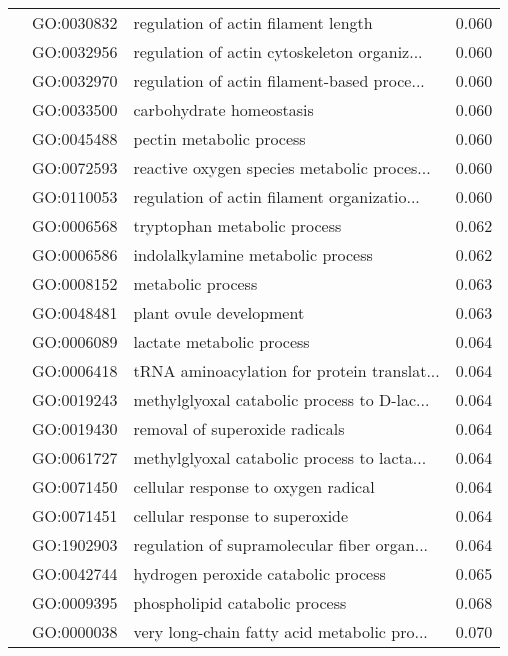 \begin{longtable}{lllr}
   & GO:0030832 &          regulation of actin filament length &         0.060 \\
   & GO:0032956 &  regulation of actin cytoskeleton organiz... &         0.060 \\
   & GO:0032970 &  regulation of actin filament-based proce... &         0.060 \\
   & GO:0033500 &                     carbohydrate homeostasis &         0.060 \\
   & GO:0045488 &                     pectin metabolic process &         0.060 \\
   & GO:0072593 &  reactive oxygen species metabolic proces... &         0.060 \\
   & GO:0110053 &  regulation of actin filament organizatio... &         0.060 \\
   & GO:0006568 &                 tryptophan metabolic process &         0.062 \\
   & GO:0006586 &            indolalkylamine metabolic process &         0.062 \\
   & GO:0008152 &                            metabolic process &         0.063 \\
   & GO:0048481 &                      plant ovule development &         0.063 \\
   & GO:0006089 &                    lactate metabolic process &         0.064 \\
   & GO:0006418 &  tRNA aminoacylation for protein translat... &         0.064 \\
   & GO:0019243 &  methylglyoxal catabolic process to D-lac... &         0.064 \\
   & GO:0019430 &               removal of superoxide radicals &         0.064 \\
   & GO:0061727 &  methylglyoxal catabolic process to lacta... &         0.064 \\
   & GO:0071450 &          cellular response to oxygen radical &         0.064 \\
   & GO:0071451 &              cellular response to superoxide &         0.064 \\
   & GO:1902903 &  regulation of supramolecular fiber organ... &         0.064 \\
   & GO:0042744 &          hydrogen peroxide catabolic process &         0.065 \\
   & GO:0009395 &               phospholipid catabolic process &         0.068 \\
   & GO:0000038 &  very long-chain fatty acid metabolic pro... &         0.070 \\

\end{longtable}
